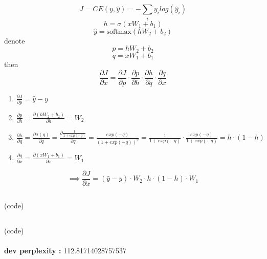\documentclass{article}
\begin{document}
\subsection{} %
\begin{equation*}
J = CE(y, \hat{y}) = -\sum_{i}{y_{i}log(\hat{y}_{i})}
\end{equation*}
\begin{equation*}
h = \sigma(xW_{1}+b_{1})
\end{equation*}
\begin{equation*}
\hat{y} = \text{softmax}(hW_{2}+b_{2})
\end{equation*}
denote
\begin{equation*}
p = hW_{2}+b_{2}
\end{equation*}
\begin{equation*}
q = xW_{1}+b_{1}
\end{equation*}
then
\begin{equation*}
\frac{\partial J }{\partial x}  = \frac{\partial J }{\partial p} \cdot \frac{\partial p}{\partial h} \cdot \frac{\partial h}{\partial q} \cdot \frac{\partial q}{\partial x}
\end{equation*}
\begin{enumerate}
\item
    $\frac{\partial J }{\partial p} = \hat{y} - y$
\item
    $\frac{\partial p}{\partial h} = \frac{\partial (hW_{2}+b_{2})}{\partial h} = W_{2}$
\item
    $\frac{\partial h}{\partial q} = \frac{\partial \sigma(q)}{\partial q} = \frac{\partial \frac{1}{1+exp(-q)}}{\partial q} = \frac{exp(-q)}{(1+exp(-q))^{2}} = \frac{1}{1+exp(-q)} \cdot \frac{exp(-q)}{1+exp(-q)} = h \cdot (1-h)$
\item
    $\frac{\partial q}{\partial x} = \frac{\partial (xW_{1}+b_{1})}{\partial x} = W_{1}$
\end{enumerate}
\begin{equation*}
    \implies  \frac{\partial J }{\partial x} = (\hat{y} - y) \cdot W_{2} \cdot h \cdot (1-h) \cdot W_{1}
\end{equation*}

\subsection{} %
(code)

\subsection{} %
(code)\\\\
\textbf{dev perplexity :} 112.81714028757537
\end{document}
